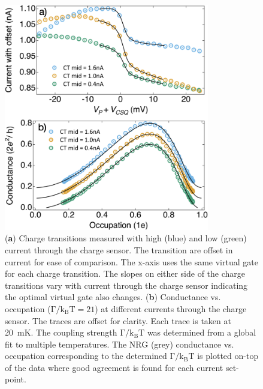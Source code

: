 \begin{figure}[!bht]
  \begin{center}
    \includegraphics[width=0.8\textwidth]{figures/ch3/crop_FiguresMaster.017.png}
    \caption[Conductance vs. Occupation : Varying the current through the charge sensor]{\label{fig:ch3/cond_occ_QPC_vs_ct} 
    (\textbf{a}) Charge transitions measured with high (blue) and low (green) current through the charge sensor. The transition are offset in current for ease of comparison. The x-axis uses the same virtual gate for each charge transition. The slopes on either side of the charge transitions vary with current through the charge sensor indicating the optimal virtual gate also changes. (\textbf{b}) Conductance vs. occupation ($\mathrm{\Gamma/k_BT=21}$) at different currents through the charge sensor. The traces are offset for clarity. Each trace is taken at \qty{20}{mK}. The coupling strength $\mathrm{\Gamma/k_BT}$ was determined from a global fit to multiple temperatures. The NRG (grey) conductance vs. occupation corresponding to the determined $\mathrm{\Gamma/k_BT}$ is plotted on-top of the data where good agreement is found for each current set-point.}
  \end{center}
\end{figure}


